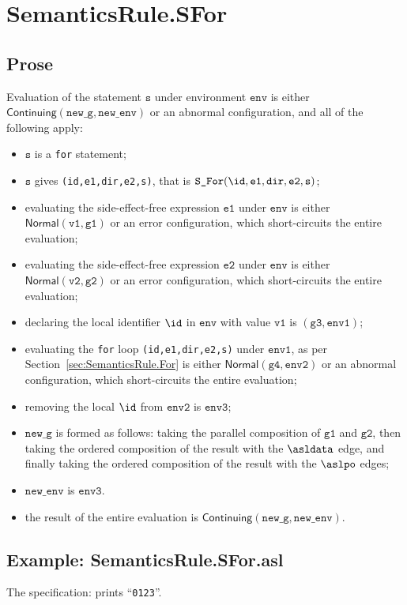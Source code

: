 \documentclass{book}
\newcommand\secref[1]{Section~\ref{sec:#1}}
\newcommand\ProseOrAbnormal[0]{or an abnormal configuration, which short-circuits the entire evaluation}
\newcommand\ProseOrError[0]{or an error configuration, which short-circuits the entire evaluation}
\newcommand\Normal[0]{\textsf{Normal}}
\newcommand\Continuing[0]{\textsf{Continuing}}
\newcommand\newenv[0]{\texttt{new\_env}}
\newcommand\env[0]{\texttt{env}}
\newcommand\envone[0]{\texttt{env1}}
\newcommand\envtwo[0]{\texttt{env2}}
\newcommand\envthree[0]{\texttt{env3}}
\newcommand\newg[0]{\texttt{new\_g}}
\newcommand\vs[0]{\texttt{s}}
\newcommand\vvone[0]{\texttt{v1}}
\newcommand\vvtwo[0]{\texttt{v2}}
\newcommand\veone[0]{\texttt{e1}}
\newcommand\vetwo[0]{\texttt{e2}}
\newcommand\vgone[0]{\texttt{g1}}
\newcommand\vgtwo[0]{\texttt{g2}}
\newcommand\vgthree[0]{\texttt{g3}}
\newcommand\vgfour[0]{\texttt{g4}}
\newcommand\dir[0]{\texttt{dir}}
\begin{document}

\section{SemanticsRule.SFor \label{sec:SemanticsRule.SFor}}
    \subsection{Prose}
    Evaluation of the statement $\vs$ under environment $\env$ is
    either $\Continuing(\newg, \newenv)$ or an abnormal configuration,
    and all of the following apply:
    \begin{itemize}
    \item $\vs$ is a \texttt{for} statement;
    \item $\vs$ gives \texttt{(id,e1,dir,e2,s)}, that is $\texttt{S\_For}(\id, \veone, \dir, \vetwo, \vs)$;
    \item evaluating the side-effect-free expression $\veone$ under $\env$ is either
    $\Normal(\vvone, \vgone)$ \ProseOrError;
    \item evaluating the side-effect-free expression $\vetwo$ under $\env$ is either
    $\Normal(\vvtwo, \vgtwo)$ \ProseOrError;
    \item declaring the local identifier $\id$ in $\env$ with value $\vvone$ is $(\vgthree, \envone)$;
    \item evaluating the \texttt{for} loop \texttt{(id,e1,dir,e2,s)} under $\envone$,
    as per \secref{SemanticsRule.For} is either $\Normal(\vgfour, \envtwo)$ \ProseOrAbnormal;
    \item removing the local $\id$ from $\envtwo$ is $\envthree$;
    \item $\newg$ is formed as follows: taking the parallel composition of $\vgone$ and $\vgtwo$,
    then taking the ordered composition of the result with the $\asldata$ edge,
    and finally taking the ordered composition of the result with the $\aslpo$ edges;
    \item $\newenv$ is $\envthree$.
    \item the result of the entire evaluation is $\Continuing(\newg, \newenv)$.
    \end{itemize}

    \subsection{Example: SemanticsRule.SFor.asl}
    The specification:
    prints ``\texttt{0123}''.
\end{document}
